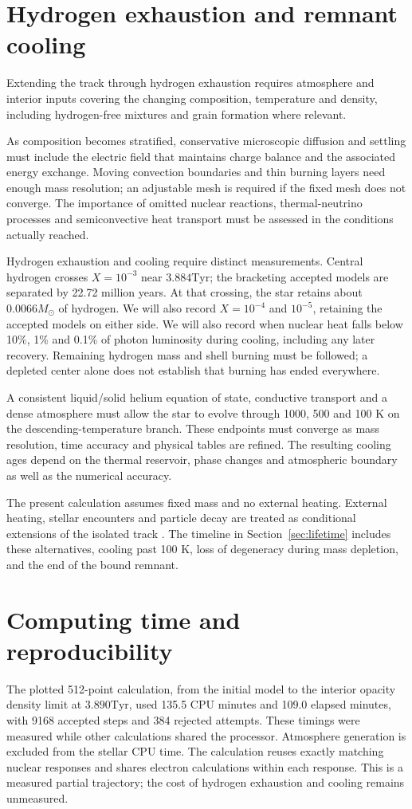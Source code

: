\documentclass[11pt,letterpaper]{article}
\newcommand{\Ms}{M_\odot}\newcommand{\Rs}{R_\odot}\newcommand{\Ls}{L_\odot}
\newcommand{\Tyr}{\mathrm{Tyr}}
\begin{document}
\section{Hydrogen exhaustion and remnant cooling}
Extending the track through hydrogen exhaustion requires atmosphere and
interior inputs covering the changing composition, temperature and density,
including hydrogen-free mixtures and grain formation where relevant.

As composition becomes stratified, conservative microscopic diffusion and
settling must include the electric field that maintains charge balance and
the associated energy exchange. Moving convection boundaries and thin burning
layers need enough mass resolution; an adjustable mesh is required if the
fixed mesh does not converge. The importance of omitted nuclear reactions,
thermal-neutrino processes and semiconvective heat transport must be assessed
in the conditions actually reached.

Hydrogen exhaustion and cooling require distinct measurements. Central hydrogen crosses $X=10^{-3}$ near $3.884\Tyr$; the bracketing
accepted models are separated by 22.72 million years. At that crossing,
the star retains about $0.0066\Ms$ of hydrogen. We will also record
$X=10^{-4}$ and $10^{-5}$, retaining the accepted models on either side. We will also record when nuclear heat
falls below 10\%, 1\% and 0.1\% of photon luminosity during cooling, including
any later recovery. Remaining hydrogen mass and shell burning must be followed;
a depleted center alone does not establish that burning has ended everywhere.

A consistent liquid/solid helium equation of state, conductive
transport and a dense atmosphere must allow the star to evolve through
1000, 500 and 100 K on the descending-temperature branch. These endpoints must
converge as mass resolution, time accuracy and physical tables are refined.
The resulting cooling ages depend on the thermal reservoir, phase changes
and atmospheric boundary as well as the numerical accuracy.

The present calculation assumes fixed mass and no external heating.
External heating, stellar encounters and particle decay are treated as
conditional extensions of the isolated track \cite{adams97}. The timeline
in Section~\ref{sec:lifetime} includes these alternatives, cooling past 100 K,
loss of degeneracy during mass depletion, and the end of the bound remnant.

\section{Computing time and reproducibility}
The plotted 512-point calculation, from the initial model to the interior opacity
density limit at $3.890\Tyr$, used 135.5 CPU minutes and 109.0 elapsed minutes,
with 9168 accepted steps and 384 rejected attempts. These timings were measured
while other calculations shared the processor. Atmosphere generation
is excluded from the stellar CPU time. The calculation reuses exactly matching nuclear responses and shares
electron calculations within each response. This is a measured partial trajectory; the cost of hydrogen
exhaustion and cooling remains unmeasured.
\end{document}
